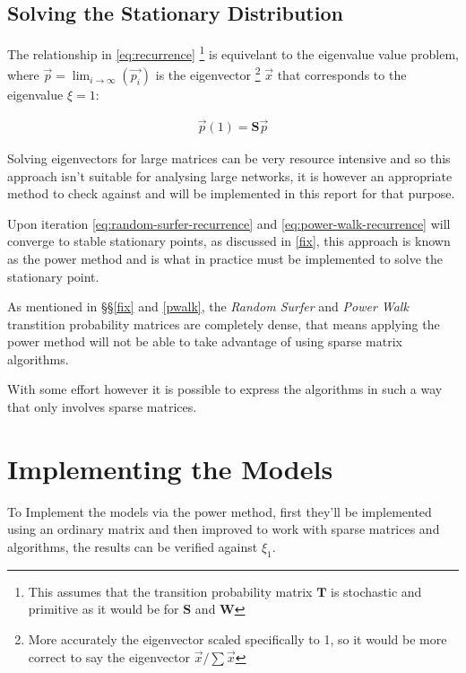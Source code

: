 \documentclass[11pt]{report}
\begin{document}
\subsection{Solving the Stationary Distribution}
\label{solving-stationary-dist}
The relationship in \eqref{eq:recurrence} \footnote{This assumes that the transition probability matrix \(\mathbf{T}\) is stochastic and primitive as it would be for \(\mathbf{S}\)
and \(\mathbf{W}\)} is equivelant to the eigenvalue value problem, where
\(\vec{p} = \lim_{i \rightarrow \infty} \left( \vec{p_{i}}\right)\) is the
eigenvector \footnote{More accurately the eigenvector scaled specifically to 1, so it would be more correct to say the eigenvector \(\vec{x} / \sum \vec{x}\)} \(\vec{x}\) that corresponds to the eigenvalue \(\xi=1\):

\begin{align}
\vec{p} (1) = \mathbf{S} \vec{p} \label{eq:eigenprob}
\end{align}

Solving eigenvectors for large matrices can be very resource intensive and so
this approach isn't suitable for analysing large networks, it is however an appropriate method to check against and will be implemented in this report for that purpose.

Upon iteration \eqref{eq:random-surfer-recurrence} and \eqref{eq:power-walk-recurrence} will converge to stable stationary points, as discussed
in \ref{fix}, this approach is known as the power method
\cite{larsonElementaryLinearAlgebra1991a} and is what in practice must be
implemented to solve the stationary point.

As mentioned in \S\S \ref{fix} and \ref{pwalk}, the \emph{Random Surfer} and \emph{Power Walk}
transtition probability matrices are completely dense, that means applying the
power method will not be able to take advantage of using sparse matrix
algorithms.

With some effort however it is possible to express the algorithms in such a way that only involves sparse matrices.

\section{Implementing the Models}
\label{implement_models}
To Implement the models via the power method, first they'll be implemented using
an ordinary matrix and then improved to work with sparse matrices and
algorithms, the results can be verified against \(\xi_{1}\).
\end{document}
